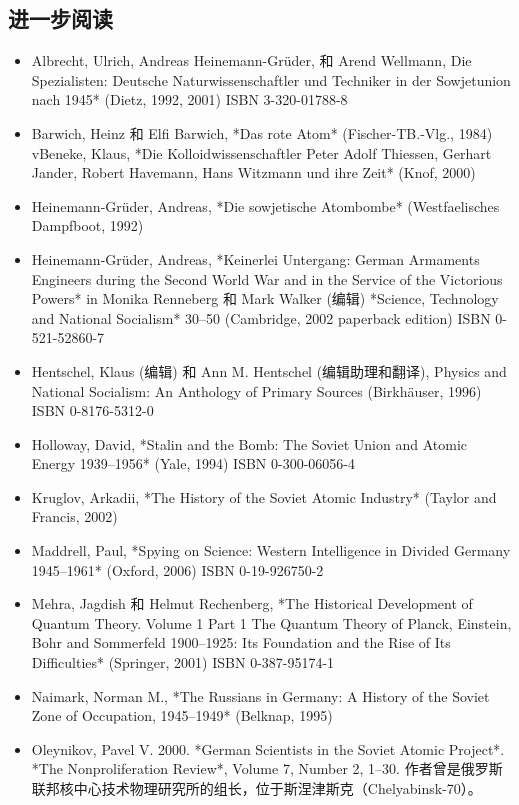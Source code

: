 \subsection{进一步阅读}
\begin{itemize}
\item Albrecht, Ulrich, Andreas Heinemann-Grüder, 和 Arend Wellmann, Die Spezialisten: Deutsche Naturwissenschaftler und Techniker in der Sowjetunion nach 1945* (Dietz, 1992, 2001) ISBN 3-320-01788-8
\item Barwich, Heinz 和 Elfi Barwich, *Das rote Atom* (Fischer-TB.-Vlg., 1984)
vBeneke, Klaus, *Die Kolloidwissenschaftler Peter Adolf Thiessen, Gerhart Jander, Robert Havemann, Hans Witzmann und ihre Zeit* (Knof, 2000)
\item Heinemann-Grüder, Andreas, *Die sowjetische Atombombe* (Westfaelisches Dampfboot, 1992)
\item Heinemann-Grüder, Andreas, *Keinerlei Untergang: German Armaments Engineers during the Second World War and in the Service of the Victorious Powers* in Monika Renneberg 和 Mark Walker (编辑) *Science, Technology and National Socialism* 30–50 (Cambridge, 2002 paperback edition) ISBN 0-521-52860-7
\item Hentschel, Klaus (编辑) 和 Ann M. Hentschel (编辑助理和翻译), Physics and National Socialism: An Anthology of Primary Sources (Birkhäuser, 1996) ISBN 0-8176-5312-0
\item Holloway, David, *Stalin and the Bomb: The Soviet Union and Atomic Energy 1939–1956* (Yale, 1994) ISBN 0-300-06056-4
\item Kruglov, Arkadii, *The History of the Soviet Atomic Industry* (Taylor and Francis, 2002)
\item Maddrell, Paul, *Spying on Science: Western Intelligence in Divided Germany 1945–1961* (Oxford, 2006) ISBN 0-19-926750-2
\item Mehra, Jagdish 和 Helmut Rechenberg, *The Historical Development of Quantum Theory. Volume 1 Part 1 The Quantum Theory of Planck, Einstein, Bohr and Sommerfeld 1900–1925: Its Foundation and the Rise of Its Difficulties* (Springer, 2001) ISBN 0-387-95174-1
\item Naimark, Norman M., *The Russians in Germany: A History of the Soviet Zone of Occupation, 1945–1949* (Belknap, 1995)
\item Oleynikov, Pavel V. 2000. *German Scientists in the Soviet Atomic Project*. *The Nonproliferation Review*, Volume 7, Number 2, 1–30. 作者曾是俄罗斯联邦核中心技术物理研究所的组长，位于斯涅津斯克（Chelyabinsk-70）。
\end{itemize}

